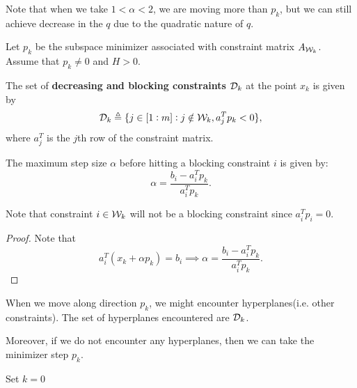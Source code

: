 \begin{refsection}
\begin{remark}
Note that when we take $1<\alpha < 2$, we are moving more than $p_k$, but we can still achieve decrease in the $q$ due to the quadratic nature of $q$.
\end{remark}








\begin{lemma}
	Let $p_k$ be the subspace minimizer associated with constraint matrix $A_{\mathcal{W}_k}$.
Assume that $p_k \neq 0$ and $H > 0$.

	The set of \textbf{decreasing and blocking constraints} $\mathcal{D}_k$ at the point $x_k$ is given by
	$$\mathcal{D}_k \triangleq \{j\in[1:m]: j\notin \mathcal{W}_k, a_j^Tp_k < 0\},$$
	where $a_j^T$ is the $j$th row of the constraint matrix.

The maximum step size $\alpha$ before hitting a blocking constraint $i$ is given by:
$$\alpha = \frac{b_i - a_i^T p_k}{a_i^Tp_k}.$$

Note that constraint $i\in \mathcal{W}_k$ will not be a blocking constraint since $a_i^T p_i = 0$.
\end{lemma}
\begin{proof}
Note that
	$$a_i^T(x_k + \alpha p_k) = b_i \implies \alpha = \frac{b_i - a_i^T p_k}{a_i^Tp_k}.$$
\end{proof}



\begin{remark}
	When we move along direction $p_k$, we might encounter hyperplanes(i.e. other constraints). The set of hyperplanes encountered are $\mathcal{D}_k$. 
	
	Moreover, if we do not encounter any hyperplanes, then we can take the minimizer step $p_k$. 
\end{remark}



\begin{algorithm}[H]
	\SetAlgoLined
	Set $k = 0$ \\
\end{algorithm}
\end{refsection}
